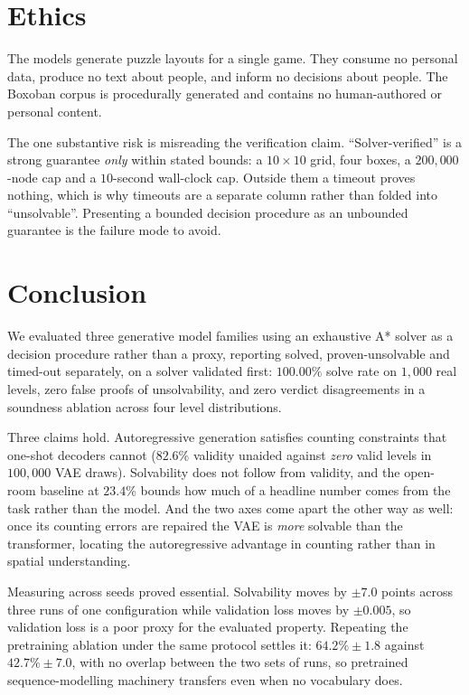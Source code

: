 \documentclass[conference]{IEEEtran}
\begin{document}
\section{Ethics}

The models generate puzzle layouts for a single game. They consume no personal
data, produce no text about people, and inform no decisions about people. The
Boxoban corpus is procedurally generated and contains no human-authored or
personal content.

The one substantive risk is misreading the verification claim.
``Solver-verified'' is a strong guarantee \emph{only} within stated bounds: a
$10\times10$ grid, four boxes, a $200{,}000$-node cap and a $10$-second
wall-clock cap. Outside them a timeout proves nothing, which is why timeouts are
a separate column rather than folded into ``unsolvable''. Presenting a bounded
decision procedure as an unbounded guarantee is the failure mode to avoid.

\section{Conclusion}
We evaluated three generative model families using an exhaustive A* solver as a
decision procedure rather than a proxy, reporting solved, proven-unsolvable and
timed-out separately, on a solver validated first: $100.00\%$ solve rate on
$1{,}000$ real levels, zero false proofs of unsolvability, and zero verdict
disagreements in a soundness ablation across four level distributions.

Three claims hold. Autoregressive generation satisfies counting constraints that
one-shot decoders cannot ($82.6\%$ validity unaided against \emph{zero} valid
levels in $100{,}000$ VAE draws). Solvability does not follow from validity, and
the open-room baseline at $23.4\%$ bounds how much of a headline number comes
from the task rather than the model. And the two axes come apart the other way
as well: once its counting errors are repaired the VAE is \emph{more} solvable
than the transformer, locating the autoregressive advantage in counting rather
than in spatial understanding.

Measuring across seeds proved essential. Solvability moves by $\pm 7.0$ points
across three runs of one configuration while validation loss moves by
$\pm 0.005$, so validation loss is a poor proxy for the evaluated property.
Repeating the pretraining ablation under the same protocol settles it:
$64.2\% \pm 1.8$ against $42.7\% \pm 7.0$, with no overlap between the two sets
of runs, so pretrained sequence-modelling machinery transfers even when no
vocabulary does.
\end{document}
